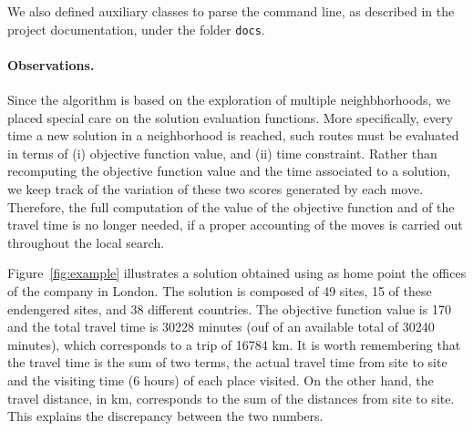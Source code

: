 \documentclass[12pt]{article}
\begin{document}
We also defined auxiliary classes to parse the command line, as described in
the project documentation, under the folder \texttt{docs}.

\paragraph{Observations.} Since the algorithm is based on the exploration of
multiple neighbhorhoods, we placed special care on the solution evaluation
functions. More specifically, every time a new solution in a neighborhood is
reached, such routes must be evaluated in terms of (i) objective function
value, and (ii) time constraint. Rather than recomputing the objective function
value and the time associated to a solution, we keep track of the variation of
these two scores generated by each move. Therefore, the full computation of the
value of the objective function and of the travel time is no longer needed, if
a proper accounting of the moves is carried out throughout the local search.

Figure~\ref{fig:example} illustrates a solution obtained using as home point
the offices of the company in London. The solution is composed of 49 sites, 15 of these
endengered sites, and 38 different countries. The objective function value is
170 and the total travel time is 30228 minutes (ouf of an available total of
30240 minutes), which corresponds to a trip of 16784 km. It is worth
remembering that the travel time is the sum of two terms, the actual travel
time from site to site and the visiting time (6 hours) of each place visited.
On the other hand, the travel distance, in km, corresponds to the sum of the
distances from site to site. This explains the discrepancy between the two
numbers.
\end{document}
